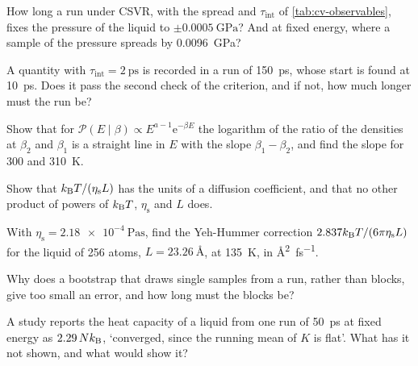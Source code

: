 \begin{exercise}
\label{ex:cv-pressure}
How long a run under CSVR, with the spread and $\tau_{\mathrm{int}}$ of
\cref{tab:cv-observables}, fixes the pressure of the liquid to
$\pm\SI{0.0005}{\giga\pascal}$? And at fixed energy, where a sample of the
pressure spreads by \SI{0.0096}{\giga\pascal}?
\end{exercise}

\begin{exercise}
\label{ex:cv-short}
A quantity with $\tau_{\mathrm{int}} = \SI{2}{\pico\second}$ is recorded in
a run of \SI{150}{\pico\second}, whose start is found at
\SI{10}{\pico\second}. Does it pass the second check of the criterion, and
if not, how much longer must the run be?
\end{exercise}

\begin{exercise}
\label{ex:cv-gamma-ratio}
Show that for $\mathcal{P}(E \mid \beta) \propto E^{a-1}\mathrm{e}^{-\beta E}$
the logarithm of the ratio of the densities at $\beta_2$ and $\beta_1$ is
a straight line in $E$ with the slope $\beta_1 - \beta_2$, and find the
slope for 300 and \SI{310}{\kelvin}.
\end{exercise}

\begin{exercise}
\label{ex:cv-units}
Show that $k_{\mathrm{B}} T/(\eta_{\mathrm s}L)$ has the units of a diffusion
coefficient, and that no other product of powers of $k_{\mathrm{B}} T$,
$\eta_{\mathrm s}$ and $L$ does.
\end{exercise}

\begin{exercise}
\label{ex:cv-yh}
With $\eta_{\mathrm s} = \SI{2.18e-4}{\pascal\second}$, find the
Yeh-Hummer correction $2.837k_{\mathrm{B}} T/(6\pi\eta_{\mathrm s}L)$ for the liquid of
256 atoms, $L = \SI{23.26}{\angstrom}$, at \SI{135}{\kelvin}, in
\si{\angstrom\squared\per\femto\second}.
\end{exercise}

\begin{exercise}
\label{ex:cv-why-blocks}
Why does a bootstrap that draws single samples from a run, rather than
blocks, give too small an error, and how long must the blocks be?
\end{exercise}

\begin{exercise}
\label{ex:cv-referee}
A study reports the heat capacity of a liquid from one run of
\SI{50}{\pico\second} at fixed energy as $2.29\,Nk_{\mathrm{B}}$, `converged, since
the running mean of $K$ is flat'. What has it not shown, and what would
show it?
\end{exercise}
